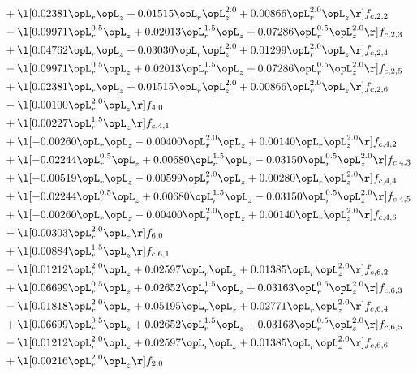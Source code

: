 \begin{alignat}{2}
& + \l[  0.02381 \opL_r \opL_z +  0.01515 \opL_r \opL_z^{2.0} +  0.00866 \opL_r^{2.0} \opL_z  \r] f_{c,2,2} \nonumber \\ 
& - \l[  0.09971 \opL_r^{0.5} \opL_z +  0.02013 \opL_r^{1.5} \opL_z +  0.07286 \opL_r^{0.5} \opL_z^{2.0}  \r] f_{c,2,3} \nonumber \\ 
& + \l[  0.04762 \opL_r \opL_z +  0.03030 \opL_r \opL_z^{2.0} +  0.01299 \opL_r^{2.0} \opL_z  \r] f_{c,2,4} \nonumber \\ 
& - \l[  0.09971 \opL_r^{0.5} \opL_z +  0.02013 \opL_r^{1.5} \opL_z +  0.07286 \opL_r^{0.5} \opL_z^{2.0}  \r] f_{c,2,5} \nonumber \\ 
& + \l[  0.02381 \opL_r \opL_z +  0.01515 \opL_r \opL_z^{2.0} +  0.00866 \opL_r^{2.0} \opL_z  \r] f_{c,2,6} \nonumber \\ 
& - \l[  0.00100 \opL_r^{2.0} \opL_z  \r] f_{4,0} \nonumber \\ 
& + \l[  0.00227 \opL_r^{1.5} \opL_z  \r] f_{c,4,1} \nonumber \\ 
& + \l[  -0.00260 \opL_r \opL_z   -0.00400 \opL_r^{2.0} \opL_z +  0.00140 \opL_r \opL_z^{2.0}  \r] f_{c,4,2} \nonumber \\ 
& + \l[  -0.02244 \opL_r^{0.5} \opL_z +  0.00680 \opL_r^{1.5} \opL_z   -0.03150 \opL_r^{0.5} \opL_z^{2.0}  \r] f_{c,4,3} \nonumber \\ 
& + \l[  -0.00519 \opL_r \opL_z   -0.00599 \opL_r^{2.0} \opL_z +  0.00280 \opL_r \opL_z^{2.0}  \r] f_{c,4,4} \nonumber \\ 
& + \l[  -0.02244 \opL_r^{0.5} \opL_z +  0.00680 \opL_r^{1.5} \opL_z   -0.03150 \opL_r^{0.5} \opL_z^{2.0}  \r] f_{c,4,5} \nonumber \\ 
& + \l[  -0.00260 \opL_r \opL_z   -0.00400 \opL_r^{2.0} \opL_z +  0.00140 \opL_r \opL_z^{2.0}  \r] f_{c,4,6} \nonumber \\ 
& - \l[  0.00303 \opL_r^{2.0} \opL_z  \r] f_{6,0} \nonumber \\ 
& + \l[  0.00884 \opL_r^{1.5} \opL_z  \r] f_{c,6,1} \nonumber \\ 
& - \l[  0.01212 \opL_r^{2.0} \opL_z +  0.02597 \opL_r \opL_z +  0.01385 \opL_r \opL_z^{2.0}  \r] f_{c,6,2} \nonumber \\ 
& + \l[  0.06699 \opL_r^{0.5} \opL_z +  0.02652 \opL_r^{1.5} \opL_z +  0.03163 \opL_r^{0.5} \opL_z^{2.0}  \r] f_{c,6,3} \nonumber \\ 
& - \l[  0.01818 \opL_r^{2.0} \opL_z +  0.05195 \opL_r \opL_z +  0.02771 \opL_r \opL_z^{2.0}  \r] f_{c,6,4} \nonumber \\ 
& + \l[  0.06699 \opL_r^{0.5} \opL_z +  0.02652 \opL_r^{1.5} \opL_z +  0.03163 \opL_r^{0.5} \opL_z^{2.0}  \r] f_{c,6,5} \nonumber \\ 
& - \l[  0.01212 \opL_r^{2.0} \opL_z +  0.02597 \opL_r \opL_z +  0.01385 \opL_r \opL_z^{2.0}  \r] f_{c,6,6} \nonumber \\ 
& + \l[  0.00216 \opL_r^{2.0} \opL_z  \r] f_{2,0} \nonumber \\ 
\end{alignat} 



